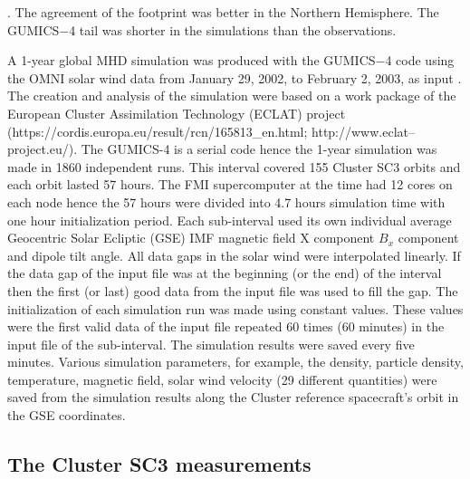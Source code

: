 \documentclass[linenumbers,draft]{agujournal}
\begin{document}
\citep{tsyganenko95:_model_earth}. The agreement of the footprint was better in the Northern Hemisphere. The GUMICS$-$4 tail was shorter in the simulations than the observations. 

A 1-year global MHD simulation was produced with the GUMICS$-$4 code using the OMNI solar wind data from January 29, 2002, to February 2, 2003, as input \citep{facsko16:_one_earth}. The creation and analysis of the simulation were based on a work package of the European Cluster Assimilation Technology (ECLAT) project (https://cordis.europa.eu/result/rcn/165813\_en.html; http://www.eclat--project.eu/). The GUMICS-4 is a serial code \citep{janhunen12:_gumic_mhd} hence the 1-year simulation was made in 1860 independent runs. This interval covered 155 Cluster SC3 orbits and each orbit lasted 57 hours. The FMI supercomputer at the time had 12 cores on each node hence the 57 hours were divided into 4.7 hours simulation time with one hour initialization period. Each sub-interval used its own individual average Geocentric Solar Ecliptic (GSE) IMF magnetic field X component $B_x$ component and dipole tilt angle. All data gaps in the solar wind were interpolated linearly. If the data gap of the input file was at the beginning (or the end) of the interval then the first (or last) good data from the input file was used to fill the gap. The initialization of each simulation run was made using constant values. These values were the first valid data of the input file repeated 60 times (60 minutes) in the input file of the sub-interval. The simulation results were saved every five minutes. Various simulation parameters, for example, the density, particle density, temperature, magnetic field, solar wind velocity (29 different quantities) were saved from the simulation results along the Cluster reference spacecraft's orbit in the GSE coordinates. 

\subsection{The Cluster SC3 measurements}
\label{sec:cluster}
\end{document}
